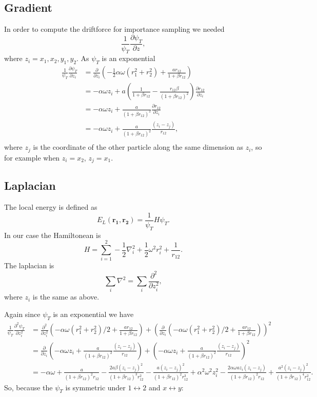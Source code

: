 \documentclass[a4paper,English,10pt]{article}
\newcommand{\bb}[1]{\boldsymbol{#1}}
\newcommand{\p}{\partial}
\newcommand{\pddt}[2]{\frac{\p #1}{\p #2}}
\newcommand{\pndt}[3]{\frac{\p^{#3} #1}{\p #2^{#3}}}
\newcommand{\f}{\frac}
\begin{document}
\subsection{Gradient}\label{app2pg}
In order to compute the driftforce for importance sampling we needed
\[\f{1}{\psi_T}\pddt{\psi_T}{z},\]
where \(z_i = x_1,x_2,y_1,y_2\).
As \(\psi_T\) is an exponential
\begin{align*}
  \f{1}{\psi_T}\pddt{\psi_T}{z_i} &= \pddt{}{z_i}\left(-\f{1}{2}\alpha\omega(r_1^2+r_2^2) + \f{ar_{12}}{1+\beta r_{12}}\right)\\
  &= -\alpha\omega z_i + a\left(\f{1}{1+\beta r_{12}} - \f{r_{12}\beta}{(1+\beta r_{12})^2}\right)\pddt{r_{12}}{z_i}\\
  &= -\alpha\omega z_i + \f{a}{(1+\beta r_{12})^2}\pddt{r_{12}}{z_i}\\
  &= -\alpha\omega z_i + \f{a}{(1+\beta r_{12})^2}\f{(z_i-z_j)}{r_{12}},\\
\end{align*}
where \(z_j\) is the coordinate of the other particle along the same dimension as \(z_i\), so for example when
\(z_i=x_2\), \(z_j = x_1\).

\subsection{Laplacian}\label{applap}

The local energy is defined as
\[E_L(\bb{r_1},\bb{r_2}) = \f{1}{\psi_T}H\psi_T.\]
In our case the Hamiltonean is
\[H = \sum_{i=1}^2-\f{1}{2}\nabla_i^2+\f{1}{2}\omega^2r_i^2 + \f{1}{r_{12}}.\]
The laplacian is
\[\sum_i\nabla^2 = \sum_i\pndt{}{z_i}{2},\]
where \(z_i\) is the same as above.

Again since \(\psi_T\) is an exponential we have
\begin{align*}
  \f{1}{\psi_T}\pndt{\psi_T}{z_i}{2} &= \pndt{}{z_i}{2}\left(-\alpha\omega(r_1^2+r_2^2)/2 + \f{ar_{12}}{1+\beta r_{12}}\right) +
    \left(\pddt{}{z_i}\left(-\alpha\omega(r_1^2+r_2^2)/2 + \f{ar_{12}}{1+\beta r_{12}}\right)\right)^2\\
    &= \pddt{}{z_i}\left(-\alpha\omega z_i + \f{a}{(1+\beta r_{12})^2}\f{(z_i-z_j)}{r_{12}}\right) +
    \left(-\alpha\omega z_i + \f{a}{(1+\beta r_{12})^2}\f{(z_i-z_j)}{r_{12}}\right)^2\\
    &= -\alpha\omega + \f{a}{(1+\beta r_{12})^2r_{12}} - \f{2a\beta(z_i-z_j)^2}{(1+\beta r_{12})^3r_{12}^2}
    - \f{a(z_i-z_j)^2}{(1+\beta r_{12})^2r_{12}^3} + \alpha^2\omega^2z_i^2 -
    \f{2\alpha\omega a z_i(z_i-z_j)}{(1+\beta r_{12})^2r_{12}} + \f{a^2(z_i-z_j)^2}{(1+\beta r_{12})^4r_{12}^2}.
\end{align*}
So, because the $\psi_T$ is symmetric under $1\leftrightarrow 2$ and $x\leftrightarrow y$:
\end{document}
